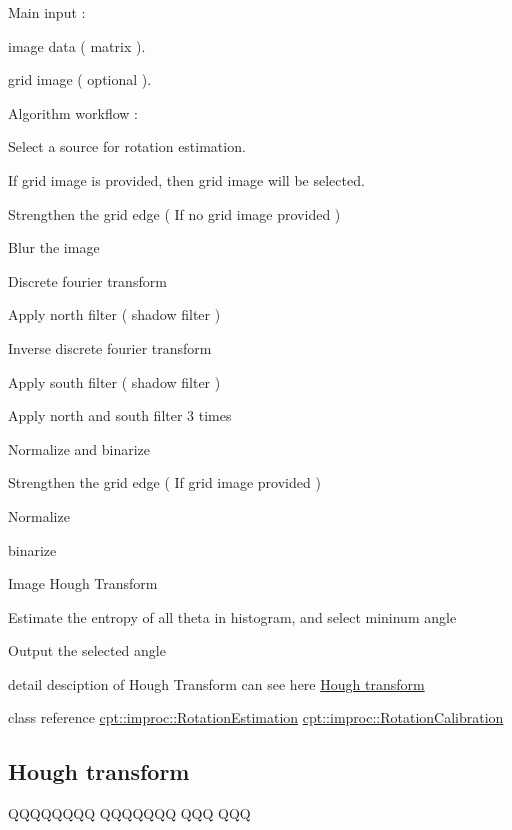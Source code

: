 Main input \-: \par

\begin{DoxyItemize}
\item image data ( matrix ).
\item grid image ( optional ). \par

\end{DoxyItemize}

Algorithm workflow \-: \par

\begin{DoxyEnumerate}
\item Select a source for rotation estimation. \par
 If grid image is provided, then grid image will be selected.
\item Strengthen the grid edge ( If no grid image provided )
\begin{DoxyEnumerate}
\item Blur the image
\item Discrete fourier transform
\item Apply north filter ( shadow filter )
\item Inverse discrete fourier transform
\item Apply south filter ( shadow filter )
\item Apply north and south filter 3 times
\item Normalize and binarize
\end{DoxyEnumerate}
\item Strengthen the grid edge ( If grid image provided )
\begin{DoxyEnumerate}
\item Normalize
\item binarize
\end{DoxyEnumerate}
\item Image Hough Transform
\item Estimate the entropy of all theta in histogram, and select mininum angle
\item Output the selected angle
\end{DoxyEnumerate}

detail desciption of Hough Transform can see here \hyperlink{hough_transform}{Hough transform}

class reference \hyperlink{classcpt_1_1improc_1_1_rotation_estimation}{cpt\-::improc\-::\-Rotation\-Estimation} \hyperlink{structcpt_1_1improc_1_1_rotation_calibration}{cpt\-::improc\-::\-Rotation\-Calibration} \hypertarget{hough_transform}{}\subsection{Hough transform}\label{hough_transform}
Q\-Q\-Q\-Q\-Q\-Q\-Q\-Q Q\-Q\-Q\-Q\-Q\-Q\-Q Q\-Q\-Q Q\-Q\-Q 